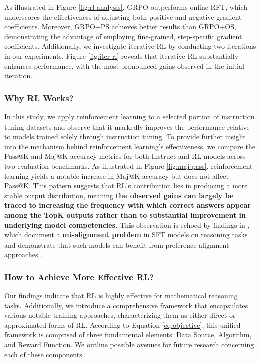 \begin{itemize}[topsep=0pt]
As illustrated in Figure \ref{fig:rl-analysis}, GRPO outperforms online RFT, which underscores the effectiveness of adjusting both positive and negative gradient coefficients. Moreover, GRPO+PS achieves better results than GRPO+OS, demonstrating the advantage of employing fine-grained, step-specific gradient coefficients. Additionally, we investigate iterative RL by conducting two iterations in our experiments. Figure \ref{fig:iter-rl} reveals that iterative RL substantially enhances performance, with the most pronounced gains observed in the initial iteration.

\subsubsection{Why RL Works?} In this study, we apply reinforcement learning to a selected portion of instruction tuning datasets and observe that it markedly improves the performance relative to models trained solely through instruction tuning. To provide further insight into the mechanism behind reinforcement learning's effectiveness, we compare the Pass@K and Maj@K accuracy metrics for both Instruct and RL models across two evaluation benchmarks. As illustrated in Figure \ref{fig:maj-pass}, reinforcement learning yields a notable increase in Maj@K accuracy but does not affect Pass@K. This pattern suggests that RL's contribution lies in producing a more stable output distribution, meaning \textbf{the observed gains can largely be traced to increasing the frequency with which correct answers appear among the TopK outputs rather than to substantial improvement in underlying model competencies.} This observation is echoed by findings in \citep{wang2023making}, which document a \textbf{misalignment problem} in SFT models on reasoning tasks and demonstrate that such models can benefit from preference alignment approaches \citep{yuan2023rrhf,song2023preference,wang2023making}.

\subsubsection{How to Achieve More Effective RL?}
\label{sec:effec_rl}
Our findings indicate that RL is highly effective for mathematical reasoning tasks. Additionally, we introduce a comprehensive framework that encapsulates various notable training approaches, characterizing them as either direct or approximated forms of RL. According to Equation \ref{eq:objective}, this unified framework is comprised of three fundamental elements: Data Source, Algorithm, and Reward Function. We outline possible avenues for future research concerning each of these components.


\end{itemize}
